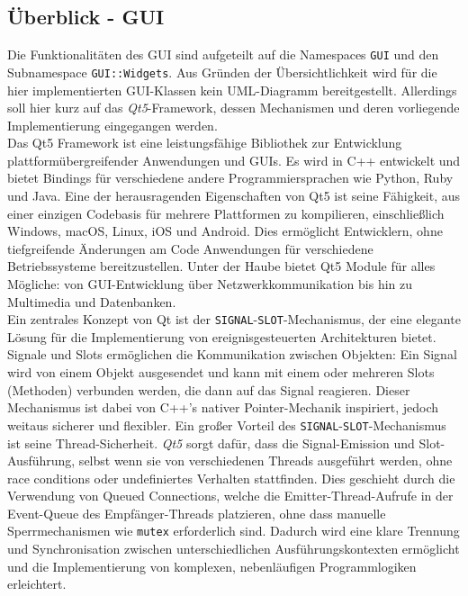 \subsection{Überblick - GUI}
\label{subsec:aufbau_frontend_ueberblick_gui}
Die Funktionalitäten des \ac{GUI} sind aufgeteilt auf die Namespaces \texttt{GUI} und den Subnamespace \texttt{GUI::Widgets}.
Aus Gründen der Übersichtlichkeit wird für die hier implementierten GUI-Klassen kein UML-Diagramm bereitgestellt.
Allerdings soll hier kurz auf das \textit{Qt5}-Framework, dessen Mechanismen und deren vorliegende Implementierung eingegangen werden.\\
Das Qt5 Framework ist eine leistungsfähige Bibliothek zur Entwicklung plattformübergreifender Anwendungen und GUIs.
Es wird in C++ entwickelt und bietet Bindings für verschiedene andere Programmiersprachen wie Python, Ruby und Java.
Eine der herausragenden Eigenschaften von Qt5 ist seine Fähigkeit, aus einer einzigen Codebasis für mehrere Plattformen zu kompilieren, einschließlich Windows, macOS, Linux, iOS und Android.
Dies ermöglicht Entwicklern, ohne tiefgreifende Änderungen am Code Anwendungen für verschiedene Betriebssysteme bereitzustellen.
Unter der Haube bietet Qt5 Module für alles Mögliche: von GUI-Entwicklung über Netzwerkkommunikation bis hin zu Multimedia und Datenbanken. \cite{Qt52024}\\
Ein zentrales Konzept von Qt ist der \texttt{SIGNAL}-\texttt{SLOT}-Mechanismus, der eine elegante Lösung für die Implementierung von ereignisgesteuerten Architekturen bietet.
Signale und Slots ermöglichen die Kommunikation zwischen Objekten: Ein Signal wird von einem Objekt ausgesendet und kann mit einem oder mehreren Slots (Methoden) verbunden werden, die dann auf das Signal reagieren.
Dieser Mechanismus ist dabei von C++'s nativer Pointer-Mechanik inspiriert, jedoch weitaus sicherer und flexibler.
Ein großer Vorteil des \texttt{SIGNAL}-\texttt{SLOT}-Mechanismus ist seine Thread-Sicherheit.
\textit{Qt5} sorgt dafür, dass die Signal-Emission und Slot-Ausführung, selbst wenn sie von verschiedenen Threads ausgeführt werden, ohne race conditions oder undefiniertes Verhalten stattfinden.
Dies geschieht durch die Verwendung von Queued Connections, welche die Emitter-Thread-Aufrufe in der Event-Queue des Empfänger-Threads platzieren, ohne dass manuelle Sperrmechanismen wie \texttt{mutex} erforderlich sind.
Dadurch wird eine klare Trennung und Synchronisation zwischen unterschiedlichen Ausführungskontexten ermöglicht und die Implementierung von komplexen, nebenläufigen Programmlogiken erleichtert.

